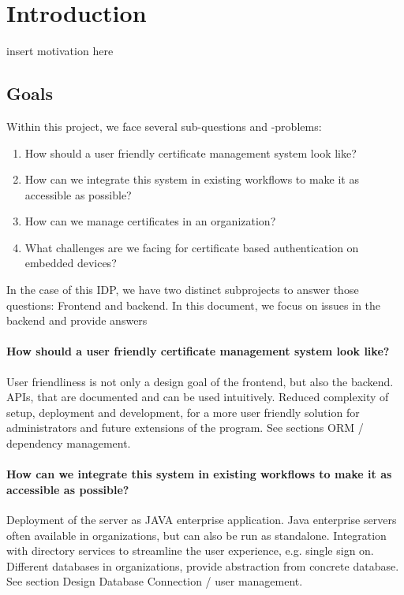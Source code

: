 \chapter{Introduction}
insert motivation here
\section{Goals}

Within this project, we face several sub-questions and -problems:
\begin{enumerate}
    \item How should a user friendly certificate management system look like?
    \item How can we integrate this system in existing workflows to make it as accessible as possible?
    \item How can we manage certificates in an organization?
    \item What challenges are we facing for certificate based authentication on embedded devices?
\end{enumerate}

In the case of this IDP, we have two distinct subprojects to answer those questions: Frontend and backend. In this
document, we focus on issues in the backend and provide answers

\subsubsection*{How should a user friendly certificate management system look like?}
User friendliness is not only a design goal of the frontend, but also the backend. APIs, that are documented and can be
used intuitively. Reduced complexity of setup, deployment and development, for a more user friendly solution for
administrators and future extensions of the program. See sections ORM / dependency management.

\subsubsection*{How can we integrate this system in existing workflows to make it as accessible as possible?}
Deployment of the server as JAVA enterprise application. Java enterprise servers often available in organizations, but
can also be run as standalone. Integration with directory services to streamline the user experience, e.g. single sign
on. Different databases in organizations, provide abstraction from concrete database. See section Design Database
Connection / user management.


